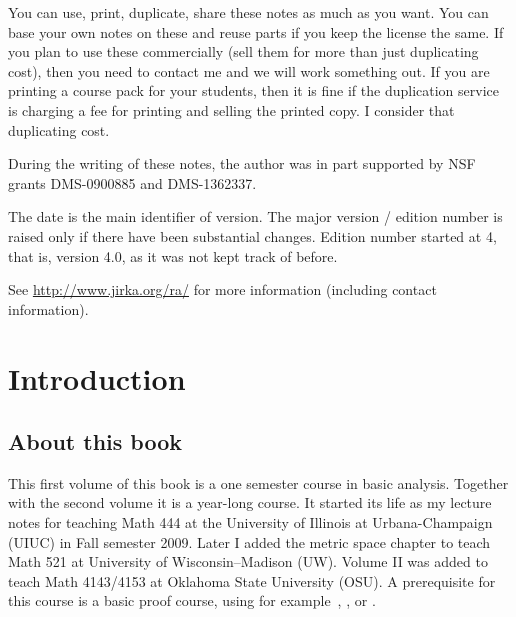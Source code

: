 \documentclass[12pt]{book}
\theoremstyle{plain}
\theoremstyle{remark}
\theoremstyle{definition}
\theoremstyle{exercise}
\theoremstyle{example}
\begin{document}
\bigskip

\noindent
You can use, print, duplicate, share these notes as much as you want.  You can
base your own notes on these and reuse parts if you keep the license the
same.  If you plan to use these commercially (sell them for more than just
duplicating cost), then you need to contact me and we will work something out.
If you are printing a course pack for your students, then it is fine if the 
duplication service is charging a fee for printing and selling the printed
copy.  I consider that duplicating cost.

\bigskip

\noindent
During the writing of these notes, 
the author was in part supported by NSF grants DMS-0900885 and
DMS-1362337.

\bigskip

\noindent
The date is the main identifier of version.  The major version / edition
number is raised only if there have been substantial changes.  Edition
number started at 4, that is, version 4.0, as it was not kept track of
before.  %

\bigskip

\noindent
See \url{http://www.jirka.org/ra/} for more information
(including contact information).



\tableofcontents
{}

\newpage


\chapter*{Introduction}


\section{About this book}

This first volume of this book is a one semester course in basic analysis.
Together with the second volume it is a year-long course.
It started its life
as my lecture notes for teaching Math 444 at the
University of Illinois at Urbana-Champaign (UIUC) in Fall semester 2009.
Later I added the metric space chapter to teach Math 521 at University of
Wisconsin--Madison (UW).
Volume II was added to teach Math 4143/4153 at Oklahoma State University
(OSU).
A prerequisite for this course is a basic proof course,
using 
for example~\cite{Hammack}, \cite{GIAM}, or \cite{DW}.
\end{document}
